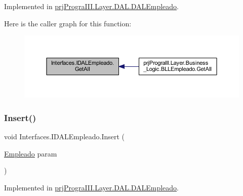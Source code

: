 Implemented in \hyperlink{classprj_progra_i_i_i_1_1_layer_1_1_d_a_l_1_1_d_a_l_empleado_ae4244254c51367a0332e10ffc7e68fcc}{prj\+Progra\+I\+I\+I.\+Layer.\+D\+A\+L.\+D\+A\+L\+Empleado}.

Here is the caller graph for this function\+:
\nopagebreak
\begin{figure}[H]
\begin{center}
\leavevmode
\includegraphics[width=350pt]{interface_interfaces_1_1_i_d_a_l_empleado_a4e47f55e63675f0430e99e0873d269ff_icgraph}
\end{center}
\end{figure}
\hypertarget{interface_interfaces_1_1_i_d_a_l_empleado_ad9609df99d0b1ad098a61ea27d700393}{}\label{interface_interfaces_1_1_i_d_a_l_empleado_ad9609df99d0b1ad098a61ea27d700393} 
\subsubsection{\texorpdfstring{Insert()}{Insert()}}
{\footnotesize\ttfamily void Interfaces.\+I\+D\+A\+L\+Empleado.\+Insert (\begin{DoxyParamCaption}\item[{\hyperlink{classprj_progra_i_i_i_1_1_layer_1_1_entities_1_1_empleado}{Empleado}}]{param }\end{DoxyParamCaption})}



Implemented in \hyperlink{classprj_progra_i_i_i_1_1_layer_1_1_d_a_l_1_1_d_a_l_empleado_a8593713e7bb16c32041cd8b342cfd3ec}{prj\+Progra\+I\+I\+I.\+Layer.\+D\+A\+L.\+D\+A\+L\+Empleado}.

